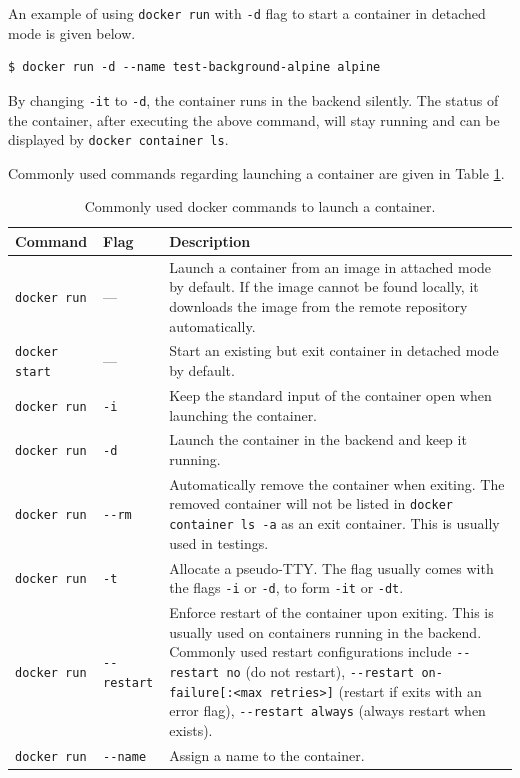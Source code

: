 An example of using \verb|docker run| with \verb|-d| flag to start a container in detached mode is given below.
\begin{lstlisting}
$ docker run -d --name test-background-alpine alpine
\end{lstlisting}
By changing \verb|-it| to \verb|-d|, the container runs in the backend silently. The status of the container, after executing the above command, will stay running and can be displayed by \verb|docker container ls|.

Commonly used commands regarding launching a container are given in Table \ref{ch:vac:tab:launchcontainer}.

\begin{table}[!htb]
	\centering \caption{Commonly used docker commands to launch a container.}\label{ch:vac:tab:launchcontainer}
	\begin{tabularx}{\textwidth}{llX}
		\hline
		Command & Flag & Description \\ \hline
		\verb|docker run| & --- & Launch a container from an image in attached mode by default. If the image cannot be found locally, it downloads the image from the remote repository automatically. \\
        \verb|docker start| & --- & Start an existing but exit container in detached mode by default. \\
        \verb|docker run| & \verb|-i| & Keep the standard input of the container open when launching the container. \\ 
        \verb|docker run| & \verb|-d| & Launch the container in the backend and keep it running. \\ 
        \verb|docker run| & \verb|--rm| & Automatically remove the container when exiting. The removed container will not be listed in \verb|docker container ls -a| as an exit container. This is usually used in testings. \\ 
        \verb|docker run| & \verb|-t| & Allocate a pseudo-TTY. The flag usually comes with the flags \verb|-i| or \verb|-d|, to form \verb|-it| or \verb|-dt|. \\ 
        \verb|docker run| & \verb|--restart| & Enforce restart of the container upon exiting. This is usually used on containers running in the backend. Commonly used restart configurations include \verb|--restart no| (do not restart), \verb|--restart on-failure[:<max retries>]| (restart if exits with an error flag), \verb|--restart always| (always restart when exists). \\ 
        \verb|docker run| & \verb|--name| & Assign a name to the container. \\
		\hline
	\end{tabularx}
\end{table}

